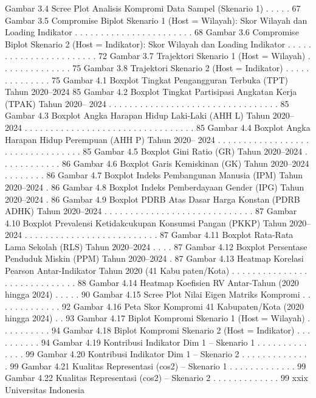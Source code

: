 Gambar 3.4 Scree Plot Analisis Kompromi Data Sampel (Skenario 1) . . . . . 67
Gambar 3.5 Compromise Biplot Skenario 1 (Host = Wilayah): Skor Wilayah
dan Loading Indikator . . . . . . . . . . . . . . . . . . . . . . . 68
Gambar 3.6 Compromise Biplot Skenario 2 (Host = Indikator): Skor Wilayah
dan Loading Indikator . . . . . . . . . . . . . . . . . . . . . . . 72
Gambar 3.7 Trajektori Skenario 1 (Host = Wilayah) . . . . . . . . . . . . . . 75
Gambar 3.8 Trajektori Skenario 2 (Host = Indikator) . . . . . . . . . . . . . . 75
Gambar 4.1 Boxplot Tingkat Pengangguran Terbuka (TPT) Tahun 2020–2024 85
Gambar 4.2 Boxplot Tingkat Partisipasi Angkatan Kerja (TPAK) Tahun 2020–
2024 . . . . . . . . . . . . . . . . . . . . . . . . . . . . . . . . . 85
Gambar 4.3 Boxplot Angka Harapan Hidup Laki-Laki (AHH L) Tahun 2020–
2024 . . . . . . . . . . . . . . . . . . . . . . . . . . . . . . . . . 85
Gambar 4.4 Boxplot Angka Harapan Hidup Perempuan (AHH P) Tahun 2020–
2024 . . . . . . . . . . . . . . . . . . . . . . . . . . . . . . . . . 85
Gambar 4.5 Boxplot Gini Ratio (GR) Tahun 2020–2024 . . . . . . . . . . . . 86
Gambar 4.6 Boxplot Garis Kemiskinan (GK) Tahun 2020–2024 . . . . . . . . 86
Gambar 4.7 Boxplot Indeks Pembangunan Manusia (IPM) Tahun 2020–2024 . 86
Gambar 4.8 Boxplot Indeks Pemberdayaan Gender (IPG) Tahun 2020–2024 . 86
Gambar 4.9 Boxplot PDRB Atas Dasar Harga Konstan (PDRB ADHK) Tahun
2020–2024 . . . . . . . . . . . . . . . . . . . . . . . . . . . . . 87
Gambar 4.10 Boxplot Prevalensi Ketidakcukupan Konsumsi Pangan (PKKP)
Tahun 2020–2024 . . . . . . . . . . . . . . . . . . . . . . . . . . 87
Gambar 4.11 Boxplot Rata-Rata Lama Sekolah (RLS) Tahun 2020–2024 . . . . 87
Gambar 4.12 Boxplot Persentase Penduduk Miskin (PPM) Tahun 2020–2024 . 87
Gambar 4.13 Heatmap Korelasi Pearson Antar-Indikator Tahun 2020 (41 Kabupaten/Kota) . . . . . . . . . . . . . . . . . . . . . . . . . . . . . 88
Gambar 4.14 Heatmap Koefisien RV Antar-Tahun (2020 hingga 2024) . . . . . 90
Gambar 4.15 Scree Plot Nilai Eigen Matriks Kompromi . . . . . . . . . . . . . 92
Gambar 4.16 Peta Skor Kompromi 41 Kabupaten/Kota (2020 hingga 2024) . . 93
Gambar 4.17 Biplot Kompromi Skenario 1 (Host = Wilayah) . . . . . . . . . . 94
Gambar 4.18 Biplot Kompromi Skenario 2 (Host = Indikator) . . . . . . . . . . 94
Gambar 4.19 Kontribusi Indikator Dim 1 – Skenario 1 . . . . . . . . . . . . . . 99
Gambar 4.20 Kontribusi Indikator Dim 1 – Skenario 2 . . . . . . . . . . . . . . 99
Gambar 4.21 Kualitas Representasi (cos2) – Skenario 1 . . . . . . . . . . . . . 99
Gambar 4.22 Kualitas Representasi (cos2) – Skenario 2 . . . . . . . . . . . . . 99
xxix Universitas Indonesia

